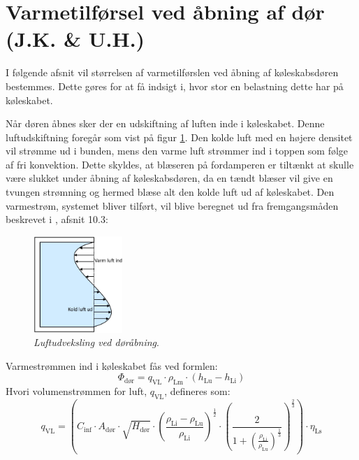 \documentclass[../Hovedrapport.tex]{subfiles}
\begin{document}
\section{Varmetilførsel ved åbning af dør (J.K. \& U.H.)}
    \label{sec:aabning_af_dor}
I følgende afsnit vil størrelsen af varmetilførslen ved åbning af køleskabsdøren bestemmes. Dette gøres for at få indsigt i, hvor stor en belastning dette har på køleskabet. 

Når døren åbnes sker der en udskiftning af luften inde i køleskabet. Denne luftudskiftning foregår som vist på figur \ref{fig:dør_luftstrøm}. Den kolde luft med en højere densitet vil strømme ud i bunden, mens den varme luft strømmer ind i toppen som følge af fri konvektion. Dette skyldes, at blæseren på fordamperen er tiltænkt at skulle være slukket under åbning af køleskabsdøren, da en tændt blæser vil give en tvungen strømning og hermed blæse alt den kolde luft ud af køleskabet. Den varmestrøm, systemet bliver tilført, vil blive beregnet ud fra fremgangsmåden beskrevet i \citep{koleteknik}, afsnit 10.3:
\begin{figure}[H]
    \centering
    \includegraphics[width=0.3\textwidth]{Billeder/dør_luftstrøm.jpg}
    \caption{\textit{Luftudveksling ved døråbning}.}
    \label{fig:dør_luftstrøm}
\end{figure}

Varmestrømmen ind i køleskabet fås ved formlen:
\begin{equation}
\label{eq:varmestrøm_dør}
    \Phi_\text{dør} = q_\text{VL} \cdot \rho_\text{Lm} \cdot \left(h_\text{Lu} - h_\text{Li} \right)
\end{equation}
Hvori volumenstrømmen for luft, $q_\text{VL}$, defineres som:
\begin{equation}
    q_\text{VL} = \left( C_\text{inf} \cdot A_\text{dør} \cdot \sqrt{H_\text{dør}} \cdot \left( {\frac{\rho_\text{Li} - \rho_\text{Lu}}{\rho_\text{Li}}} \right)^{\frac{1}{2}} \cdot \left( \frac{2}{1+ {\left( {\frac{\rho_\text{Li}}{\rho_\text{Lu}}} \right)}^{\frac{1}{3}}} \right)^{\frac{2}{3}} \right) \cdot \eta_\text{Ls}
    \label{eq:volumenstrøm_dør}
\end{equation}
\end{document}
